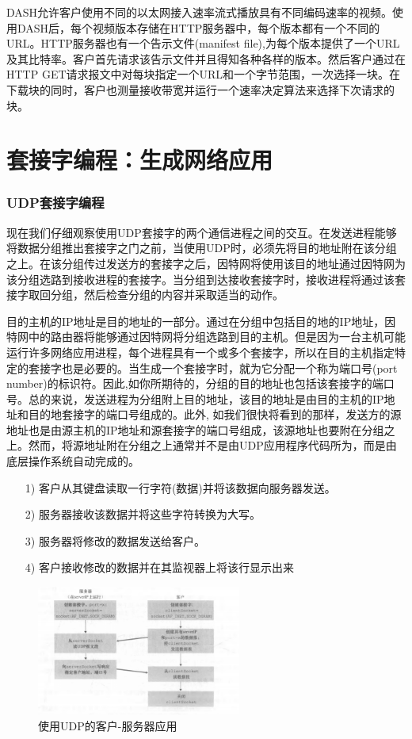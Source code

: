     DASH允许客户使用不同的以太网接入速率流式播放具有不同编码速率的视频。使用DASH后，每个视频版本存储在HTTP服务器中，每个版本都有一个不同的URL。HTTP服务器也有一个告示文件(manifest file),为每个版本提供了一个URL及其比特率。客户首先请求该告示文件并且得知各种各样的版本。然后客户通过在HTTP GET请求报文中对每块指定一个URL和一个字节范围，一次选择一块。在下载块的同时，客户也测量接收带宽并运行一个速率决定算法来选择下次请求的块。

\section{套接字编程：生成网络应用}

\subsubsection{UDP套接字编程}

    现在我们仔细观察使用UDP套接字的两个通信进程之间的交互。在发送进程能够将数据分组推出套接字之门之前，当使用UDP时，必须先将目的地址附在该分组之上。在该分组传过发送方的套接字之后，因特网将使用该目的地址通过因特网为该分组选路到接收进程的套接字。当分组到达接收套接字时，接收进程将通过该套接字取回分组，然后检查分组的内容并采取适当的动作。

    目的主机的IP地址是目的地址的一部分。通过在分组中包括目的地的IP地址，因特网中的路由器将能够通过因特网将分组选路到目的主机。但是因为一台主机可能运行许多网络应用进程，每个进程具有一个或多个套接字，所以在目的主机指定特定的套接字也是必要的。当生成一个套接字时，就为它分配一个称为端口号(port number)的标识符。因此,如你所期待的，分组的目的地址也包括该套接字的端口号。总的来说，发送进程为分组附上目的地址，该目的地址是由目的主机的IP地址和目的地套接字的端口号组成的。此外, 如我们很快将看到的那样，发送方的源地址也是由源主机的IP地址和源套接字的端口号组成，该源地址也要附在分组之上。然而，将源地址附在分组之上通常并不是由UDP应用程序代码所为，而是由底层操作系统自动完成的。

\begin{itemize}
    \item [1)] 客户从其键盘读取一行字符(数据)并将该数据向服务器发送。
    \item [2)] 服务器接收该数据并将这些字符转换为大写。
    \item [3)] 服务器将修改的数据发送给客户。
    \item [4)] 客户接收修改的数据并在其监视器上将该行显示出来
\end{itemize}

\begin{figure}[!htbp]
    \centering
    \includegraphics[width=0.6\textwidth]{image/chapter02/UDP服务流程.png}
    \caption{使用UDP的客户-服务器应用}
\end{figure}

